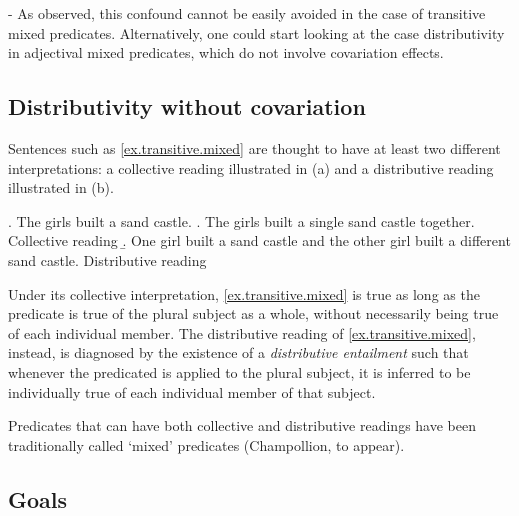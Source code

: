 \documentclass[a4paper]{article}
\begin{document}
- As observed, this confound cannot be easily avoided in the case of transitive mixed predicates. Alternatively, one could start looking at the case distributivity in adjectival mixed predicates, which do not involve covariation effects. 


\subsection{Distributivity without covariation}







Sentences such as  \ref{ex.transitive.mixed} are thought to have at least two different interpretations: a collective reading illustrated in (a) and a distributive reading illustrated in (b). 

\ex. The girls built a sand castle. \label{ex.transitive.mixed}
\a. The girls built a single sand castle together. \hfill{Collective reading}
\b. One girl built a sand castle and the other girl built a different sand castle.  \hfill{Distributive reading}

Under its collective interpretation, \ref{ex.transitive.mixed} is true as long as the predicate is true of the plural subject as a whole, without necessarily being true of each individual member. 
The distributive reading of \ref{ex.transitive.mixed}, instead, is diagnosed by the existence of a \emph{distributive entailment} such that whenever the predicated is applied to the plural subject, it is inferred to be individually true of each individual member of that subject. 

Predicates that can have both collective and distributive readings have been traditionally called `mixed' predicates (Champollion, to appear). 
%










\subsection{Goals}
\end{document}
